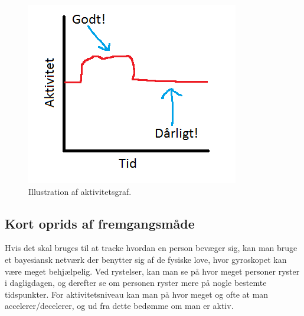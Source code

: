 \begin{figure}
	\centering
	\includegraphics{graphics/aktivitet_billed}
	\caption{Illustration af aktivitetsgraf.}\label{aktivitetsgraf}
\end{figure}


\subsection{Kort oprids af fremgangsmåde} 
Hvis det skal bruges til at tracke hvordan en person bevæger sig, kan man bruge et bayesiansk netværk der benytter sig af de fysiske love, hvor gyroskopet kan være meget behjælpelig. Ved rystelser, kan man se på hvor meget personer ryster i dagligdagen, og derefter se om personen ryster mere på nogle bestemte tidspunkter. For aktivitetsniveau kan man på hvor meget og ofte at man accelerer/decelerer, og ud fra dette bedømme om man er aktiv.
